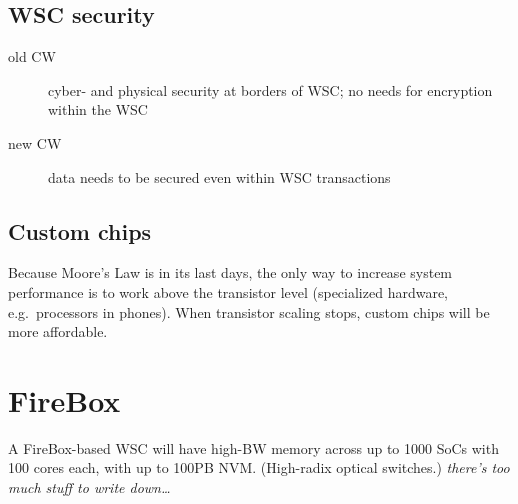 \subsection{WSC security}
\begin{description}
	\item[old CW] cyber- and physical security at borders of WSC; no needs for encryption within the WSC
	\item[new CW] data needs to be secured even within WSC transactions
\end{description}

\subsection{Custom chips}
Because Moore's Law is in its last days, the only way to increase system performance is to work above the transistor level (specialized hardware, e.g.~processors in phones). When transistor scaling stops, custom chips will be more affordable.

\section{FireBox}
A FireBox-based WSC will have high-BW memory across up to 1000 SoCs with 100 cores each, with up to 100PB NVM. (High-radix optical switches.) \emph{there's too much stuff to write down\ldots}